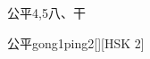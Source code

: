 \begin{entry}{公平}{4,5}{⼋、⼲}
  \begin{phonetics}{公平}{gong1ping2}[][HSK 2]
  \end{phonetics}
\end{entry}

